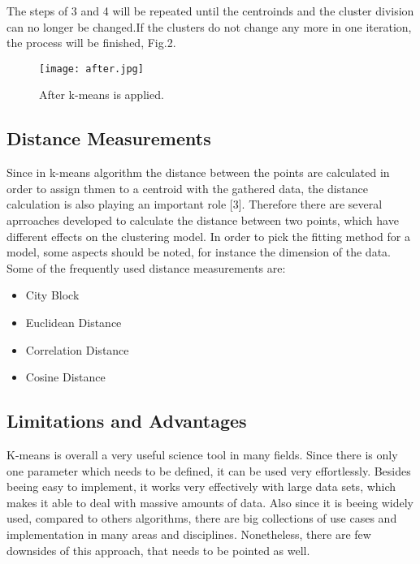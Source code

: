 \documentclass[conference]{IEEEtran}
\begin{document}
The steps of 3 and 4 will be repeated until the centroinds and the cluster division can no longer be changed.If the clusters do not change any more in one iteration, the process will be finished, Fig.2. 

\begin{figure}[htbp]
\centerline{\texttt{[image: after.jpg]}}
\caption{After k-means is applied.}
\label{fig2}
\end{figure}

\subsection{Distance Measurements}
Since in k-means algorithm the distance between the points are calculated in order to assign thmen to a centroid with the gathered data, the distance calculation is also playing an important role [3]. Therefore there are several aprroaches developed to calculate the distance between two points, which have different effects on the clustering model. In order to pick the fitting method for a model, some aspects should be noted, for instance the dimension of the data. Some of the frequently used distance measurements are:

\begin{itemize}
  \item City Block\\
  \item Euclidean Distance\\
  \item Correlation Distance\\
  \item Cosine Distance
\end{itemize}

\subsection{Limitations and Advantages }
K-means is overall a very useful science tool in many fields. Since there is only one parameter which needs to be defined, it can be used very effortlessly. Besides beeing easy to implement, it works very effectively with large data sets, which makes it able to deal with massive amounts of data. Also since it is beeing widely used, compared to others algorithms, there are big collections of use cases and implementation in many areas and disciplines. Nonetheless, there are few downsides of this approach, that needs to be pointed as well.\\
\end{document}

